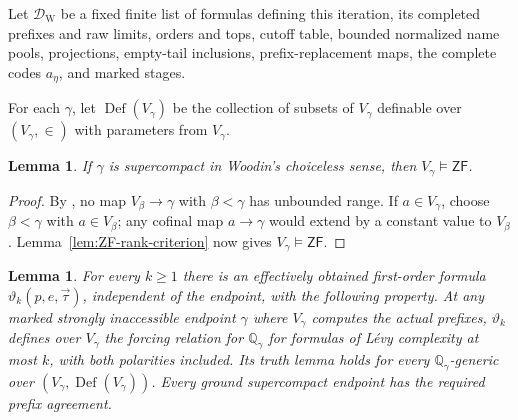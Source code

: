 \documentclass[11pt,a4paper]{amsart}
\newcommand{\ZF}{\mathsf{ZF}}
\newcommand{\Def}{\operatorname{Def}}
\theoremstyle{plain}
\newtheorem{lemma}[theorem]{Lemma}
\theoremstyle{definition}
\theoremstyle{remark}
\begin{document}
Let $\mathcal D_{\mathrm W}$ be a fixed finite list of formulas
defining this iteration, its completed prefixes and raw limits,
orders and tops, cutoff table, bounded normalized name pools,
projections, empty-tail inclusions, prefix-replacement maps,
the complete codes $a_\eta$, and marked stages.

For each $\gamma$, let $\Def(V_\gamma)$ be the collection of subsets of $V_\gamma$ definable over $(V_\gamma,\in)$ with parameters from $V_\gamma$.

\begin{lemma}\label{lem:supercompact-rank-ZF}
If $\gamma$ is supercompact in Woodin's choiceless sense, then $V_\gamma\models\ZF$.
\end{lemma}

\begin{proof}

By \cite[Definition~19 and the proof of Theorem~44]{Spoerl}, no map $V_\beta\to\gamma$ with $\beta<\gamma$ has unbounded range.  If $a\in V_\gamma$, choose $\beta<\gamma$ with $a\in V_\beta$; any cofinal map $a\to\gamma$ would extend by a constant value to $V_\beta$.  Lemma~\ref{lem:ZF-rank-criterion} now gives $V_\gamma\models\ZF$.
\end{proof}

\begin{lemma}\label{lem:Woodin-endpoint-forcing}
For every $k\geq1$ there is an effectively obtained first-order formula
$\vartheta_k(p,e,\vec\tau)$, independent of the endpoint, with the
following property.  At any marked strongly inaccessible endpoint
$\gamma$ where $V_\gamma$ computes the actual prefixes,
$\vartheta_k$ defines over $V_\gamma$ the forcing relation for
$\mathbb Q_\gamma$ for formulas of L\'evy complexity at most $k$,
with both polarities included.  Its truth lemma holds for every
$\mathbb Q_\gamma$-generic over
$(V_\gamma,\Def(V_\gamma))$.
Every ground supercompact endpoint has the required prefix agreement.
\end{lemma}
\end{document}

